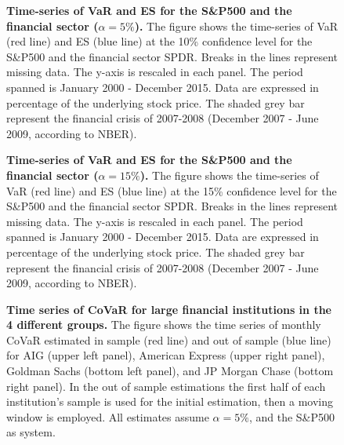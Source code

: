 \documentclass[11pt,a4paper,english]{article}
\begin{document}
\begin{figure}[H]
	\centering
	\captionsetup{singlelinecheck=true, font = footnotesize}
	\caption{
		\textbf{Time-series of VaR and ES for the S\&P500 and the financial sector ($\alpha=5\%$).}
		The figure shows the time-series of VaR (red line) and ES (blue line) at the 10\% confidence level for the S\&P500 and the financial sector SPDR. Breaks in the lines represent missing data. The y-axis is rescaled in each panel. The period spanned is January 2000 - December 2015. Data are expressed in percentage of the underlying stock price. The shaded grey bar represent the financial crisis of 2007-2008 (December 2007 - June 2009, according to NBER).}
	\label{fig: varctsmkt10}
\end{figure}

\begin{figure}[H]
	\centering
	\captionsetup{singlelinecheck=true, font = footnotesize}
	\caption{
		\textbf{Time-series of VaR and ES for the S\&P500 and the financial sector ($\alpha=15\%$).}
		The figure shows the time-series of VaR (red line) and ES (blue line) at the 15\% confidence level for the S\&P500 and the financial sector SPDR. Breaks in the lines represent missing data. The y-axis is rescaled in each panel. The period spanned is January 2000 - December 2015. Data are expressed in percentage of the underlying stock price. The shaded grey bar represent the financial crisis of 2007-2008 (December 2007 - June 2009, according to NBER).}
	\label{fig: varctsmkt15}
\end{figure}


\begin{figure}[H]
	\centering
	\captionsetup{singlelinecheck=true, font = footnotesize}
	\caption{
		\textbf{Time series of CoVaR for large financial institutions in the 4 different groups.}
		The figure shows the time series of monthly CoVaR estimated in sample (red line) and out of sample (blue line) for AIG (upper left panel), American Express (upper right panel), Goldman Sachs (bottom left panel), and JP Morgan Chase (bottom right panel). In the out of sample estimations the first half of each institution's sample is used for the initial estimation, then a moving window is employed. All estimates assume $\alpha = 5\%$, and the S\&P500 as system.}
	\label{fig: isvsoos}
\end{figure}
\end{document}
